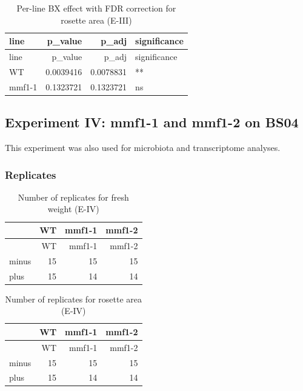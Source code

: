 \documentclass[
  10pt,
]{article}
\begin{document}
\begin{longtable}[]{@{}lrrl@{}}
\caption{Per-line BX effect with FDR correction for rosette area
(E-III)}\tabularnewline
\toprule\noalign{}
line & p\_value & p\_adj & significance \\
\midrule\noalign{}
\endfirsthead
\toprule\noalign{}
line & p\_value & p\_adj & significance \\
\midrule\noalign{}
\endhead
\bottomrule\noalign{}
\endlastfoot
WT & 0.0039416 & 0.0078831 & ** \\
mmf1-1 & 0.1323721 & 0.1323721 & ns \\
\end{longtable}

\newpage

\subsection{\texorpdfstring{\textbf{Experiment IV: mmf1-1 and mmf1-2 on
BS04}}{Experiment IV: mmf1-1 and mmf1-2 on BS04}}\label{experiment-iv-mmf1-1-and-mmf1-2-on-bs04}

This experiment was also used for microbiota and transcriptome analyses.

\subsubsection{\texorpdfstring{\textbf{Replicates}}{Replicates}}\label{replicates-1}

\begin{longtable}[]{@{}lrrr@{}}
\caption{Number of replicates for fresh weight (E-IV)}\tabularnewline
\toprule\noalign{}
& WT & mmf1-1 & mmf1-2 \\
\midrule\noalign{}
\endfirsthead
\toprule\noalign{}
& WT & mmf1-1 & mmf1-2 \\
\midrule\noalign{}
\endhead
\bottomrule\noalign{}
\endlastfoot
minus & 15 & 15 & 15 \\
plus & 15 & 14 & 14 \\
\end{longtable}

\begin{longtable}[]{@{}lrrr@{}}
\caption{Number of replicates for rosette area (E-IV)}\tabularnewline
\toprule\noalign{}
& WT & mmf1-1 & mmf1-2 \\
\midrule\noalign{}
\endfirsthead
\toprule\noalign{}
& WT & mmf1-1 & mmf1-2 \\
\midrule\noalign{}
\endhead
\bottomrule\noalign{}
\endlastfoot
minus & 15 & 15 & 15 \\
plus & 15 & 14 & 14 \\
\end{longtable}
\end{document}
